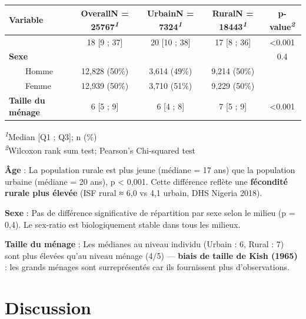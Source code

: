 \documentclass[
  10pt,
]{article}
\begin{document}
\begin{table}
\fontsize{12.0pt}{14.0pt}\selectfont
\begin{tabular*}{\linewidth}{@{\extracolsep{\fill}}lcccc}
\toprule
\textbf{Variable} & \textbf{Overall}N = 25767\textsuperscript{\textit{1}} & \textbf{Urbain}N = 7324\textsuperscript{\textit{1}} & \textbf{Rural}N = 18443\textsuperscript{\textit{1}} & \textbf{p-value}\textsuperscript{\textit{2}} \\ 
\midrule\addlinespace[2.5pt]
{\bfseries Âge (années)} & 18 [9 ; 37] & 20 [10 ; 38] & 17 [8 ; 36] & <0.001 \\ 
{\bfseries Sexe} &  &  &  & 0.4 \\ 
    Homme & 12,828 (50\%) & 3,614 (49\%) & 9,214 (50\%) &  \\ 
    Femme & 12,939 (50\%) & 3,710 (51\%) & 9,229 (50\%) &  \\ 
{\bfseries Taille du ménage} & 6 [5 ; 9] & 6 [4 ; 8] & 7 [5 ; 9] & <0.001 \\ 
\bottomrule
\end{tabular*}
\begin{minipage}{\linewidth}
\vspace{.05em}
\textsuperscript{\textit{1}}Median {[}Q1 ; Q3{]}; n (\%)\\
\textsuperscript{\textit{2}}Wilcoxon rank sum test; Pearson's Chi-squared test\\
\end{minipage}
\end{table}

\textbf{Âge} : La population rurale est plus jeune (médiane = 17 ans)
que la population urbaine (médiane = 20 ans), p \textless{} 0,001. Cette
différence reflète une \textbf{fécondité rurale plus élevée} (ISF rural
≈ 6,0 vs 4,1 urbain, DHS Nigeria 2018).

\textbf{Sexe} : Pas de différence significative de répartition par sexe
selon le milieu (p = 0,4). Le sex-ratio est biologiquement stable dans
tous les milieux.

\textbf{Taille du ménage} : Les médianes au niveau individu (Urbain : 6,
Rural : 7) sont plus élevées qu'au niveau ménage (4/5) --- \textbf{biais
de taille de Kish (1965)} : les grands ménages sont surreprésentés car
ils fournissent plus d'observations.

\newpage{}

\section{Discussion}\label{discussion}
\end{document}
